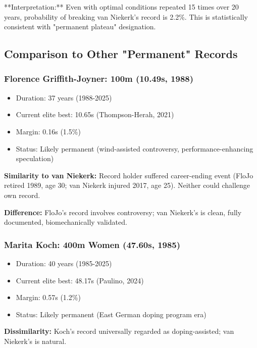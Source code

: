 **Interpretation:** Even with optimal conditions repeated 15 times over 20 years, probability of breaking van Niekerk's record is 2.2\%. This is statistically consistent with "permanent plateau" designation.

\subsection{Comparison to Other "Permanent" Records}

\subsubsection{Florence Griffith-Joyner: 100m (10.49s, 1988)}

\begin{itemize}
    \item Duration: 37 years (1988-2025)
    \item Current elite best: 10.65s (Thompson-Herah, 2021)
    \item Margin: 0.16s (1.5\%)
    \item Status: Likely permanent (wind-assisted controversy, performance-enhancing speculation)
\end{itemize}

\textbf{Similarity to van Niekerk:} Record holder suffered career-ending event (FloJo retired 1989, age 30; van Niekerk injured 2017, age 25). Neither could challenge own record.

\textbf{Difference:} FloJo's record involves controversy; van Niekerk's is clean, fully documented, biomechanically validated.

\subsubsection{Marita Koch: 400m Women (47.60s, 1985)}

\begin{itemize}
    \item Duration: 40 years (1985-2025)
    \item Current elite best: 48.17s (Paulino, 2024)
    \item Margin: 0.57s (1.2\%)
    \item Status: Likely permanent (East German doping program era)
\end{itemize}

\textbf{Dissimilarity:} Koch's record universally regarded as doping-assisted; van Niekerk's is natural.

